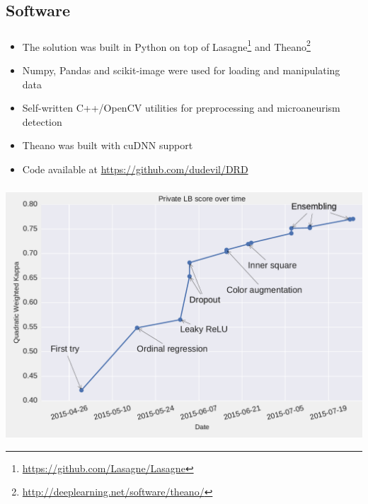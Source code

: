 \subsection{Software}

\begin{frame}\frametitle{}
\begin{itemize}
\item The solution was built in Python on top of Lasagne\footnote{\href{https://github.com/Lasagne/Lasagne}{https://github.com/Lasagne/Lasagne}} and Theano\footnote{\href{http://deeplearning.net/software/theano/}{http://deeplearning.net/software/theano/}}
\item Numpy, Pandas and scikit-image were used for loading and manipulating data
\item Self-written C++/OpenCV utilities for preprocessing and microaneurism detection
\item Theano was built with cuDNN support
\item Code available at \href{https://github.com/dudevil/DRD}{https://github.com/dudevil/DRD}
\end{itemize}
\end{frame}

\begin{frame}\frametitle{} 
\begin{center}
\includegraphics[width=\textwidth]{pics/private_lb_score_increase_annotated.pdf}
\end{center}
\end{frame}


